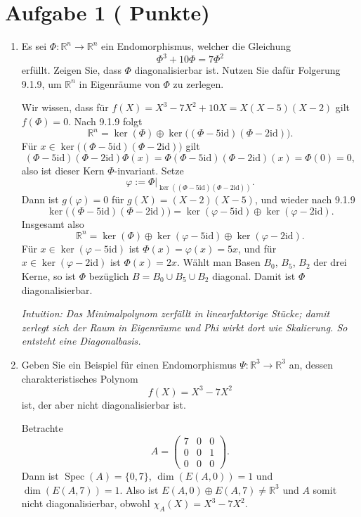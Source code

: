 \documentclass[11pt, a4paper]{article}
\newcommand{\aufgabe}[2]{%
  \section*{\Large\bfseries Aufgabe #1%
  \if\relax\detokenize{#2}\relax\else \hfill\normalfont\normalsize(#2 Punkte)\fi}%
  \vspace{-1.5ex}
}
\begin{document}
\aufgabe{1}{}
\begin{enumerate}
  \item Es sei $\Phi:\mathbb{R}^n\to\mathbb{R}^n$ ein Endomorphismus, welcher die Gleichung
  \[
    \Phi^3+10\Phi=7\Phi^2
  \]
  erfüllt. Zeigen Sie, dass $\Phi$ diagonalisierbar ist. Nutzen Sie dafür Folgerung 9.1.9, um $\mathbb{R}^n$ in Eigenräume von $\Phi$ zu zerlegen.
  \begin{framed}
  Wir wissen, dass für $f(X)=X^3-7X^2+10X=X(X-5)(X-2)$ gilt $f(\Phi)=0$. Nach 9.1.9 folgt
  \[
    \mathbb{R}^n=\ker(\Phi)\oplus\ker\!\big((\Phi-5\mathrm{id})(\Phi-2\mathrm{id})\big).
  \]
  Für $x\in\ker\!\big((\Phi-5\mathrm{id})(\Phi-2\mathrm{id})\big)$ gilt
  \[
    (\Phi-5\mathrm{id})(\Phi-2\mathrm{id})\Phi(x)
     =\Phi(\Phi-5\mathrm{id})(\Phi-2\mathrm{id})(x)=\Phi(0)=0,
  \]
  also ist dieser Kern $\Phi$-invariant. Setze
  \[
    \varphi:=\Phi\big|_{\ker((\Phi-5\mathrm{id})(\Phi-2\mathrm{id}))}.
  \]
  Dann ist $g(\varphi)=0$ für $g(X)=(X-2)(X-5)$, und wieder nach 9.1.9
  \[
    \ker\!\big((\Phi-5\mathrm{id})(\Phi-2\mathrm{id})\big)
      =\ker(\varphi-5\mathrm{id})\oplus\ker(\varphi-2\mathrm{id}).
  \]
  Insgesamt also
  \[
    \mathbb{R}^n=\ker(\Phi)\oplus\ker(\varphi-5\mathrm{id})\oplus\ker(\varphi-2\mathrm{id}).
  \]
  Für $x\in\ker(\varphi-5\mathrm{id})$ ist $\Phi(x)=\varphi(x)=5x$, und für
  $x\in\ker(\varphi-2\mathrm{id})$ ist $\Phi(x)=2x$. Wählt man Basen $B_0$,
  $B_5$, $B_2$ der drei Kerne, so ist $\Phi$ bezüglich
  $B=B_0\cup B_5\cup B_2$ diagonal. Damit ist $\Phi$ diagonalisierbar.

  \medskip\noindent\textit{Intuition: Das Minimalpolynom zerfällt in linearfaktorige Stücke; damit zerlegt sich der Raum in Eigenräume und Phi wirkt dort wie Skalierung. So entsteht eine Diagonalbasis.}
  \end{framed}

  \item Geben Sie ein Beispiel für einen Endomorphismus $\Psi:\mathbb{R}^3\to\mathbb{R}^3$ an, dessen charakteristisches Polynom
  \[
    f(X)=X^3-7X^2
  \]
  ist, der aber nicht diagonalisierbar ist.
  \begin{framed}
  Betrachte
  \[
    A=\begin{pmatrix}
      7&0&0\\
      0&0&1\\
      0&0&0
    \end{pmatrix}.
  \]
  Dann ist $\operatorname{Spec}(A)=\{0,7\}$, $\dim(E(A,0))=1$ und
  $\dim(E(A,7))=1$. Also ist
  $E(A,0)\oplus E(A,7)\neq\mathbb{R}^3$ und $A$ somit nicht diagonalisierbar,
  obwohl $\chi_A(X)=X^3-7X^2$.


\end{framed}
\end{enumerate}
\end{document}
